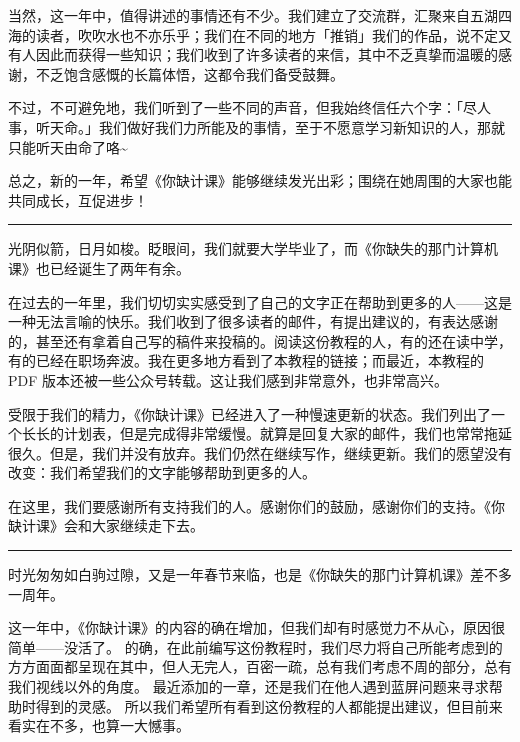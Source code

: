 当然，这一年中，值得讲述的事情还有不少。我们建立了交流群，汇聚来自五湖四海的读者，吹吹水也不亦乐乎；我们在不同的地方「推销」我们的作品，说不定又有人因此而获得一些知识；我们收到了许多读者的来信，其中不乏真挚而温暖的感谢，不乏饱含感慨的长篇体悟，这都令我们备受鼓舞。

不过，不可避免地，我们听到了一些不同的声音，但我始终信任六个字：「尽人事，听天命。」我们做好我们力所能及的事情，至于不愿意学习新知识的人，那就只能听天由命了咯\textasciitilde

总之，新的一年，希望《你缺计课》能够继续发光出彩；围绕在她周围的大家也能共同成长，互促进步！


\begin{center}\rule{0.5\linewidth}{0.5pt}\end{center}

光阴似箭，日月如梭。眨眼间，我们就要大学毕业了，而《你缺失的那门计算机课》也已经诞生了两年有余。

在过去的一年里，我们切切实实感受到了自己的文字正在帮助到更多的人——这是一种无法言喻的快乐。我们收到了很多读者的邮件，有提出建议的，有表达感谢的，甚至还有拿着自己写的稿件来投稿的。阅读这份教程的人，有的还在读中学，有的已经在职场奔波。我在更多地方看到了本教程的链接；而最近，本教程的 PDF 版本还被一些公众号转载。这让我们感到非常意外，也非常高兴。

受限于我们的精力，《你缺计课》已经进入了一种慢速更新的状态。我们列出了一个长长的计划表，但是完成得非常缓慢。就算是回复大家的邮件，我们也常常拖延很久。但是，我们并没有放弃。我们仍然在继续写作，继续更新。我们的愿望没有改变：我们希望我们的文字能够帮助到更多的人。

在这里，我们要感谢所有支持我们的人。感谢你们的鼓励，感谢你们的支持。《你缺计课》会和大家继续走下去。


\begin{center}\rule{0.5\linewidth}{0.5pt}\end{center}

时光匆匆如白驹过隙，又是一年春节来临，也是《你缺失的那门计算机课》差不多一周年。

这一年中，《你缺计课》的内容的确在增加，但我们却有时感觉力不从心，原因很简单——没活了。
的确，在此前编写这份教程时，我们尽力将自己所能考虑到的方方面面都呈现在其中，但人无完人，百密一疏，总有我们考虑不周的部分，总有我们视线以外的角度。
最近添加的一章，还是我们在他人遇到蓝屏问题来寻求帮助时得到的灵感。
所以我们希望所有看到这份教程的人都能提出建议，但目前来看实在不多，也算一大憾事。

